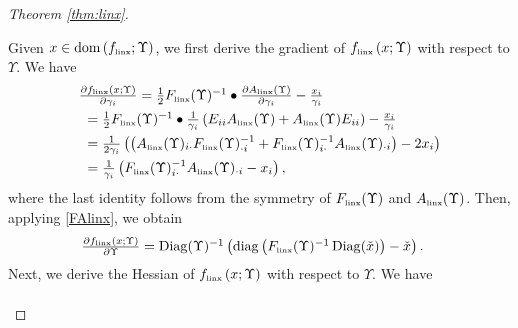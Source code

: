 \documentclass[smallextended]{svjour3hack}       %
\makeatletter
\DeclareMathOperator{\Diag}{Diag}
\DeclareMathOperator{\diag}{diag}
\DeclareMathOperator{\dom}{dom}
\renewcommand*{\top}{%
  {\mathpalette\@transpose{}}%
}
\newcommand*{\@transpose}[2]{%
  \raisebox{\depth}{$\m@th#1\mathsf{T}$}%
}
\makeatother
\begin{document}
\begin{proof}[Theorem \ref{thm:linx}]
\begin{itemize}
    Given $x\in \dom\left(f_{{\tiny\mbox{linx}}};\Upsilon\right)$, we first derive the gradient of $f_{{\tiny\mbox{linx}}}\left(x;\Upsilon\right)$ with respect to $\Upsilon$. We have
    \begin{align*}
         &\textstyle\frac{\partial f_{{\tiny\mbox{linx}}}\left(x;\Upsilon\right)}{\partial \gamma_i}=\frac{1}{2} F_{{\tiny\mbox{linx}}}(\Upsilon)^{-1}\bullet \frac{\partial A_{{\tiny\mbox{linx}}}(\Upsilon)}{\partial \gamma_i} -\frac{x_i}{\gamma_i}\\
         & ~=\textstyle\frac{1}{2}  F_{{\tiny\mbox{linx}}}(\Upsilon)^{-1}\bullet \frac{1}{\gamma_i}\left(E_{ii}A_{{\tiny\mbox{linx}}}(\Upsilon)+A_{{\tiny\mbox{linx}}}(\Upsilon) E_{ii}\right)-\frac{x_i}{\gamma_i}\\
    &~ =\textstyle\frac{1}{2\gamma_i}\left(\left(A_{{\tiny\mbox{linx}}}(\Upsilon)_{i\cdot}F_{{\tiny\mbox{linx}}}(\Upsilon)^{-1}_{\cdot i}+F_{{\tiny\mbox{linx}}}(\Upsilon)^{-1}_{i\cdot}A_{{\tiny\mbox{linx}}}(\Upsilon)_{\cdot i}\right)-2x_i\right)\\
    & ~=\textstyle\frac{1}{\gamma_i}\left(F_{{\tiny\mbox{linx}}}(\Upsilon)^{-1}_{i\cdot}A_{{\tiny\mbox{linx}}}(\Upsilon)_{\cdot i}-x_i\right),
    \end{align*}
    where the last identity follows from the symmetry of  $F_{{\tiny\mbox{linx}}}(\Upsilon)$ and $A_{{\tiny\mbox{linx}}}(\Upsilon)$. Then, applying \eqref{FAlinx}, we obtain
    \begin{align*}
        &\textstyle\frac{\partial f_{{\tiny\mbox{linx}}}\left(x;\Upsilon\right)}{\partial \Upsilon}
=\Diag(\Upsilon)^{-1}\left(\diag\left(F_{{\tiny\mbox{linx}}}(\Upsilon)^{-1}\Diag(\check{x})\right)-\check{x}\right).
    \end{align*}
   Next, we derive the Hessian of $f_{{\tiny\mbox{linx}}}\left(x;\Upsilon\right)$ with respect to $\Upsilon$. We have
    \begin{align*}

\end{align*}
\end{itemize}
\end{proof}
\end{document}
